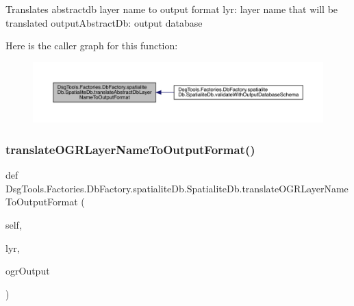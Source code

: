 \begin{DoxyVerb}Translates abstractdb layer name to output format
lyr: layer name that will be translated
outputAbstractDb: output database
\end{DoxyVerb}
 Here is the caller graph for this function\+:
\nopagebreak
\begin{figure}[H]
\begin{center}
\leavevmode
\includegraphics[width=350pt]{class_dsg_tools_1_1_factories_1_1_db_factory_1_1spatialite_db_1_1_spatialite_db_a573a18e4e871fa495d1c2ccff47bdfc3_icgraph}
\end{center}
\end{figure}
\mbox{\label{class_dsg_tools_1_1_factories_1_1_db_factory_1_1spatialite_db_1_1_spatialite_db_ae4ad7af93f5880d53ef2a3ca5e9fefcc}} 
\subsubsection{\texorpdfstring{translate\+O\+G\+R\+Layer\+Name\+To\+Output\+Format()}{translateOGRLayerNameToOutputFormat()}}
{\footnotesize\ttfamily def Dsg\+Tools.\+Factories.\+Db\+Factory.\+spatialite\+Db.\+Spatialite\+Db.\+translate\+O\+G\+R\+Layer\+Name\+To\+Output\+Format (\begin{DoxyParamCaption}\item[{}]{self,  }\item[{}]{lyr,  }\item[{}]{ogr\+Output }\end{DoxyParamCaption})}

